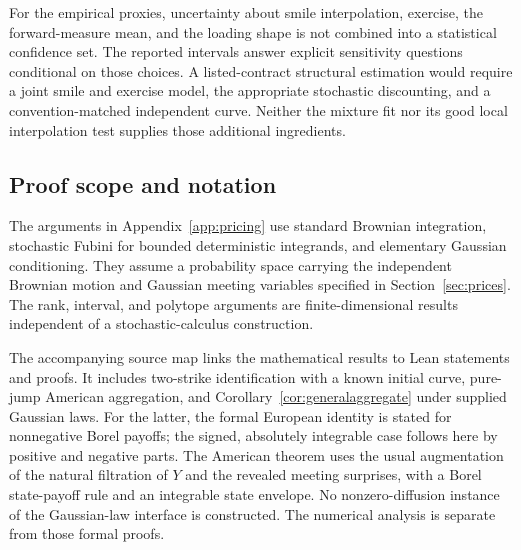 For the empirical proxies, uncertainty about smile interpolation, exercise, the forward-measure mean, and the loading shape is not combined into a statistical confidence set. The reported intervals answer explicit sensitivity questions conditional on those choices. A listed-contract structural estimation would require a joint smile and exercise model, the appropriate stochastic discounting, and a convention-matched independent curve. Neither the mixture fit nor its good local interpolation test supplies those additional ingredients.



\FloatBarrier

\subsection{Proof scope and notation}
The arguments in Appendix~\ref{app:pricing} use standard Brownian integration, stochastic Fubini for bounded deterministic integrands, and elementary Gaussian conditioning. They assume a probability space carrying the independent Brownian motion and Gaussian meeting variables specified in Section~\ref{sec:prices}. The rank, interval, and polytope arguments are finite-dimensional results independent of a stochastic-calculus construction.

The accompanying source map links the mathematical results to Lean statements and proofs. It includes two-strike identification with a known initial curve, pure-jump American aggregation, and Corollary~\ref{cor:generalaggregate} under supplied Gaussian laws. For the latter, the formal European identity is stated for nonnegative Borel payoffs; the signed, absolutely integrable case follows here by positive and negative parts. The American theorem uses the usual augmentation of the natural filtration of $Y$ and the revealed meeting surprises, with a Borel state-payoff rule and an integrable state envelope. No nonzero-diffusion instance of the Gaussian-law interface is constructed. The numerical analysis is separate from those formal proofs.

